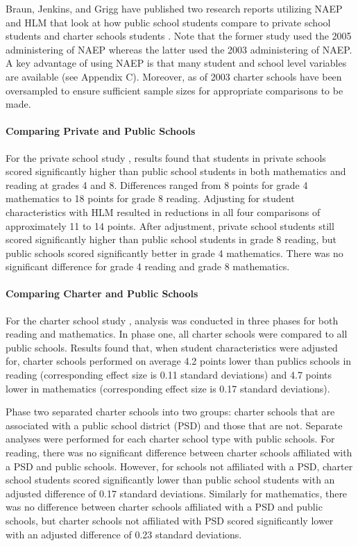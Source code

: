 \documentclass[letterpaper,12p,twoside]{article} %
\begin{document}
Braun, Jenkins, and Grigg have published two research reports utilizing NAEP and HLM that look at how public school students compare to private school students \citeyear{BraunJenkinsGrigg2006private} and charter schools students \citeyear{BraunJenkinsGrigg2006}. Note that the former study used the 2005 administering of NAEP whereas the latter used the 2003 administering of NAEP. A key advantage of using NAEP is that many student and school level variables are available (see Appendix C). Moreover, as of 2003 charter schools have been oversampled to ensure sufficient sample sizes for appropriate comparisons to be made. 

\paragraph{Comparing Private and Public Schools}
For the private school study \cite{BraunJenkinsGrigg2006private}, results found that students in private schools scored significantly higher than public school students in both mathematics and reading at grades 4 and 8. Differences ranged from 8 points for grade 4 mathematics to 18 points for grade 8 reading. Adjusting for student characteristics with HLM resulted in reductions in all four comparisons of approximately 11 to 14 points. After adjustment, private school students still scored significantly higher than public school students in grade 8 reading, but public schools scored significantly better in grade 4 mathematics. There was no significant difference for grade 4 reading and grade 8 mathematics.

\paragraph{Comparing Charter and Public Schools}
For the charter school study \cite{BraunJenkinsGrigg2006}, analysis was conducted in three phases for both reading and mathematics. In phase one, all charter schools were compared to all public schools. Results found that, when student characteristics were adjusted for, charter schools performed on average 4.2 points lower than publics schools in reading (corresponding effect size is 0.11 standard deviations) and 4.7 points lower in mathematics (corresponding effect size is 0.17 standard deviations). 

Phase two separated charter schools into two groups: charter schools that are associated with a public school district (PSD) and those that are not. Separate analyses were performed for each charter school type with public schools. For reading, there was no significant difference between charter schools affiliated with a PSD and public schools. However, for schools not affiliated with a PSD, charter school students scored significantly lower than public school students with an adjusted difference of 0.17 standard deviations. Similarly for mathematics, there was no difference between charter schools affiliated with a PSD and public schools, but charter schools not affiliated with PSD scored significantly lower with an adjusted difference of 0.23 standard deviations.
\end{document}
